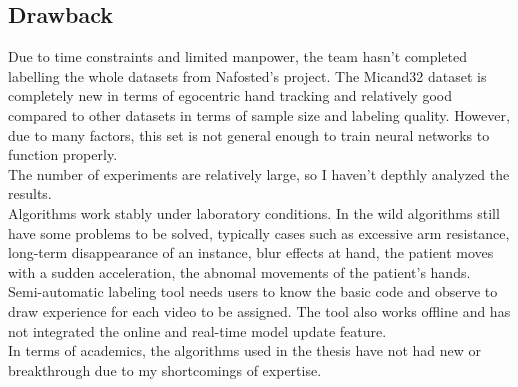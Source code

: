 \subsection{Drawback}
Due to time constraints and limited manpower, the team hasn't completed labelling the whole datasets from Nafosted's project. The Micand32 dataset is completely new in terms of egocentric hand tracking and relatively good compared to other datasets in terms of sample size and labeling quality. However, due to many factors, this set is not general enough to train neural networks to function properly.
\\The number of experiments are relatively large, so I haven’t depthly analyzed the results.
\\Algorithms work stably under laboratory conditions. In the wild algorithms still have some problems to be solved, typically cases such as excessive arm resistance, long-term disappearance of an instance, blur effects at hand, the patient moves with a sudden acceleration, the abnomal movements of the patient’s hands.
\\Semi-automatic labeling tool needs users to know the basic code and observe to draw experience for each video to be assigned. The tool also works offline and has not integrated the online and real-time model update feature.
\\In terms of academics, the algorithms used in the thesis have not had new or breakthrough due to my shortcomings of expertise.
